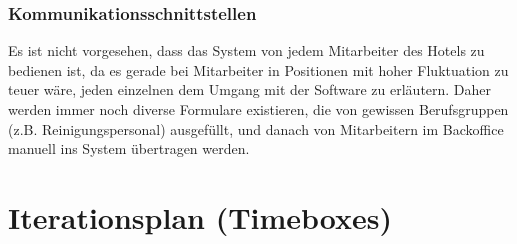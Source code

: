 \documentclass[10pt,a4paper,titlepage]{article}
\begin{document}
\subsubsection{Kommunikationsschnittstellen}
Es ist nicht vorgesehen, dass das System von jedem Mitarbeiter des Hotels zu bedienen ist, da es gerade bei Mitarbeiter in Positionen mit hoher Fluktuation zu teuer wäre, jeden einzelnen dem Umgang mit der Software zu erläutern. Daher werden immer noch diverse Formulare existieren, die von gewissen Berufsgruppen (z.B. Reinigungspersonal) ausgefüllt, und danach von Mitarbeitern im Backoffice manuell ins System übertragen werden.

\newpage

\section{Iterationsplan (Timeboxes)}


\newpage

\printglossary[title=Glossar,toctitle=GLOSSAR]
\end{document}
